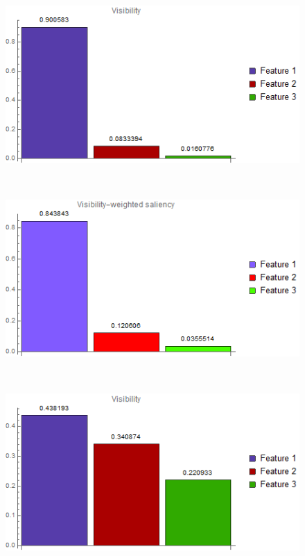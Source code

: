 \begin{figure}
	\begin{minipage}{.24\textwidth}
		\includegraphics[width=1\linewidth]{images/vortex_naive_visibility_chart}
		\subcaption{}
	\end{minipage}~
	\begin{minipage}{.24\textwidth}
		\includegraphics[width=1\linewidth]{images/vortex_naive_visibility_saliency_weighted_chart}
		\subcaption{}
	\end{minipage}~
	\begin{minipage}{.24\textwidth}
		\includegraphics[width=1\linewidth]{images/vortex_naive_optimized_fixed_visibility_chart}

\end{minipage}
\end{figure}
